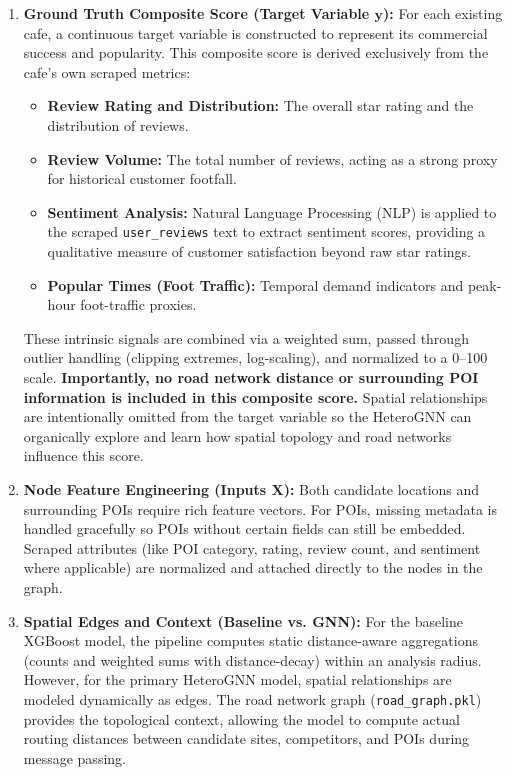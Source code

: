 \begin{enumerate}
    \item \textbf{Ground Truth Composite Score (Target Variable $\mathbf{y}$):} For each existing cafe, a continuous target variable is constructed to represent its commercial success and popularity. This composite score is derived exclusively from the cafe's own scraped metrics:
    \begin{itemize}
        \item \textbf{Review Rating and Distribution:} The overall star rating and the distribution of reviews.
        \item \textbf{Review Volume:} The total number of reviews, acting as a strong proxy for historical customer footfall.
        \item \textbf{Sentiment Analysis:} Natural Language Processing (NLP) is applied to the scraped \texttt{user\_reviews} text to extract sentiment scores, providing a qualitative measure of customer satisfaction beyond raw star ratings.
        \item \textbf{Popular Times (Foot Traffic):} Temporal demand indicators and peak-hour foot-traffic proxies.
    \end{itemize}
    These intrinsic signals are combined via a weighted sum, passed through outlier handling (clipping extremes, log-scaling), and normalized to a 0--100 scale. \textbf{Importantly, no road network distance or surrounding POI information is included in this composite score.} Spatial relationships are intentionally omitted from the target variable so the HeteroGNN can organically explore and learn how spatial topology and road networks influence this score.

    \item \textbf{Node Feature Engineering (Inputs $\mathbf{X}$):} Both candidate locations and surrounding POIs require rich feature vectors. For POIs, missing metadata is handled gracefully so POIs without certain fields can still be embedded. Scraped attributes (like POI category, rating, review count, and sentiment where applicable) are normalized and attached directly to the nodes in the graph. 
    
    \item \textbf{Spatial Edges and Context (Baseline vs. GNN):} For the baseline XGBoost model, the pipeline computes static distance-aware aggregations (counts and weighted sums with distance-decay) within an analysis radius. However, for the primary HeteroGNN model, spatial relationships are modeled dynamically as edges. The road network graph (\texttt{road\_graph.pkl}) provides the topological context, allowing the model to compute actual routing distances between candidate sites, competitors, and POIs during message passing.
\end{enumerate}

